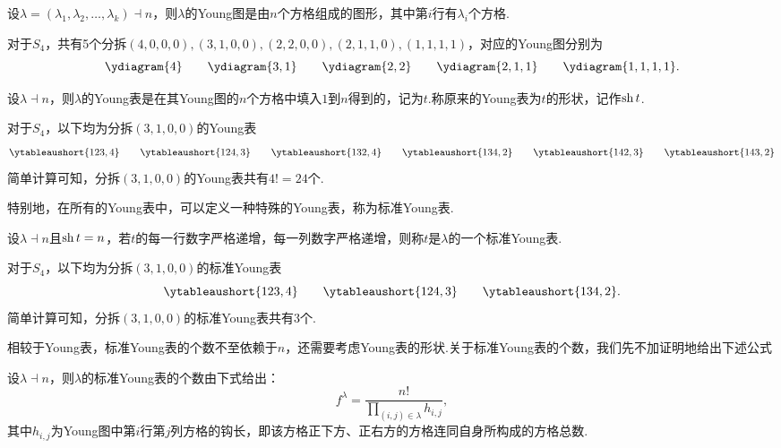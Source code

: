 \begin{definition}[Young图]
    设$\lambda=(\lambda_1,\lambda_2,\ldots,\lambda_k)\dashv n$，则$\lambda$的Young图是由$n$个方格组成的图形，其中第$i$行有$\lambda_i$个方格.
\end{definition}

\begin{example}
    对于$S_4$，共有5个分拆$(4,0,0,0),(3,1,0,0),(2,2,0,0),(2,1,1,0),(1,1,1,1)$，对应的Young图分别为
    \begin{equation*}
        \ydiagram{4}\qquad \ydiagram{3,1}\qquad \ydiagram{2,2}\qquad \ydiagram{2,1,1}\qquad \ydiagram{1,1,1,1}.
    \end{equation*}
\end{example}

\begin{definition}[Young表]
    设$\lambda\dashv n$，则$\lambda$的Young表是在其Young图的$n$个方格中填入$1$到$n$得到的，记为$t$.称原来的Young表为$t$的形状，记作$\operatorname{sh} t$.
\end{definition}

\begin{example}
    对于$S_4$，以下均为分拆$(3,1,0,0)$的Young表
    \begin{equation*}
        \ytableaushort{123,4}\qquad \ytableaushort{124,3}\qquad \ytableaushort{132,4}\qquad \ytableaushort{134,2}\qquad \ytableaushort{142,3}\qquad \ytableaushort{143,2}
    \end{equation*}
    简单计算可知，分拆$(3,1,0,0)$的Young表共有$4! =24$个.
\end{example}

特别地，在所有的Young表中，可以定义一种特殊的Young表，称为标准Young表.
\begin{definition}[标准Young表]
    设$\lambda\dashv n$且$\operatorname{sh} t=n$，若$t$的每一行数字严格递增，每一列数字严格递增，则称$t$是$\lambda$的一个标准Young表.
\end{definition}

\begin{example}
    对于$S_4$，以下均为分拆$(3,1,0,0)$的标准Young表
    \begin{equation*}
        \ytableaushort{123,4}\qquad \ytableaushort{124,3}\qquad \ytableaushort{134,2}.
    \end{equation*}
    简单计算可知，分拆$(3,1,0,0)$的标准Young表共有$3$个.
\end{example}
相较于Young表，标准Young表的个数不至依赖于$n$，还需要考虑Young表的形状.关于标准Young表的个数，我们先不加证明地给出下述公式
\begin{theorem}[钩长公式]
    设$\lambda\dashv n$，则$\lambda$的标准Young表的个数由下式给出：
    \begin{equation*}
        f^\lambda = \frac{n!}{\prod_{(i,j)\in\lambda} h_{i,j}},
    \end{equation*}
    其中$h_{i,j}$为Young图中第$i$行第$j$列方格的钩长，即该方格正下方、正右方的方格连同自身所构成的方格总数.
\end{theorem}


